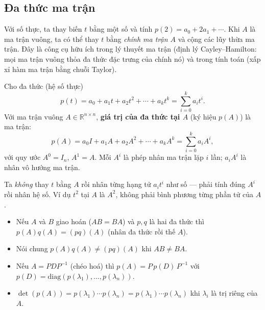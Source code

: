 \documentclass[12pt,a4paper]{article}
\begin{document}
\subsection{Đa thức ma trận}

\begin{dongco}
Với số thực, ta thay biến $t$ bằng một số và tính $p(2) = a_0 + 2a_1 + \cdots$. Khi $A$ là ma trận vuông, ta có thể thay $t$ bằng \emph{chính ma trận $A$} và cộng các lũy thừa ma trận. Đây là công cụ hữu ích trong lý thuyết ma trận (định lý Cayley--Hamilton: mọi ma trận vuông thỏa đa thức đặc trưng của chính nó) và trong tính toán (xấp xỉ hàm ma trận bằng chuỗi Taylor).
\end{dongco}

\begin{dinhnghia}
  Cho đa thức (hệ số thực)
  \[
    p(t) = a_0 + a_1 t + a_2 t^2 + \cdots + a_k t^k = \sum_{i=0}^{k} a_i t^i.
  \]
  Với ma trận vuông $A \in \mathbb{R}^{n\times n}$, \textbf{giá trị của đa thức tại $A$} (ký hiệu $p(A)$) là ma trận:
  \[
    p(A) = a_0 I + a_1 A + a_2 A^2 + \cdots + a_k A^k = \sum_{i=0}^{k} a_i A^i,
  \]
  với quy ước $A^0 = I_n$, $A^1 = A$. Mỗi $A^i$ là phép nhân ma trận lặp $i$ lần; $a_i A^i$ là nhân vô hướng ma trận.
\end{dinhnghia}

\begin{ynghia}
Ta \emph{không} thay $t$ bằng $A$ rồi nhân từng hạng tử $a_i t^i$ như số --- phải tính đúng $A^i$ rồi nhân hệ số. Ví dụ $t^2$ tại $A$ là $A^2$, không phải bình phương từng phần tử của $A$.
\end{ynghia}

\begin{tinhchat}
\begin{itemize}
  \item Nếu $A$ và $B$ giao hoán ($AB = BA$) và $p, q$ là hai đa thức thì $p(A)q(A) = (pq)(A)$ (nhân đa thức rồi thế $A$).
  \item Nói chung $p(A)q(A) \ne (pq)(A)$ khi $AB \ne BA$.
  \item Nếu $A = PDP^{-1}$ (chéo hoá) thì $p(A) = P\,p(D)\,P^{-1}$ với $p(D) = \mathrm{diag}(p(\lambda_1), \ldots, p(\lambda_n))$.
  \item $\det(p(A)) = p(\lambda_1)\cdots p(\lambda_n) = p(\lambda_1)\cdots p(\lambda_n)$ khi $\lambda_i$ là trị riêng của $A$.
\end{itemize}
\end{tinhchat}
\end{document}
